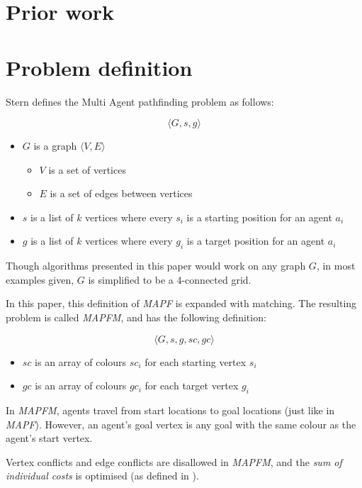 \documentclass[english]{article}
\begin{document}
\begin{multicols}{2}
\section{Prior work}


\section{Problem definition}

Stern \cite{mapf_definition_stern_2019} defines the Multi Agent pathfinding problem as follows:

$$
\langle G, s, g \rangle
$$

\begin{itemize}
    \item $G$ is a graph $\langle V, E \rangle$ 
    \begin{itemize}
        \item $V$ is a set of vertices
        \item $E$ is a set of edges between vertices
    \end{itemize}

    \item $s$ is a list of $k$ vertices where every $s_i$ is a starting position for an agent $a_i$
    \item $g$ is a list of $k$ vertices where every $g_i$ is a target position for an agent $a_i$
\end{itemize}

Though algorithms presented in this paper would work on any graph $G$, in most examples given, $G$ is simplified to be a 4-connected grid.

In this paper, this definition of \textit{MAPF} is expanded with matching. The resulting problem is called \textit{MAPFM}, and has the following definition:

$$
\langle G, s, g, sc, gc \rangle
$$

\begin{itemize}
    \item $sc$ is an array of colours $sc_i$ for each starting vertex $s_i$
    \item $gc$ is an array of colours $gc_i$ for each target vertex $g_i$
\end{itemize}

In \textit{MAPFM}, agents travel from start locations to goal locations (just like in \textit{MAPF}). However, an agent's goal vertex is any goal with the same colour as the agent's start vertex. 

Vertex conflicts and edge conflicts are disallowed in \textit{MAPFM}, and the \textit{sum of individual costs} is optimised (as defined in \cite{mapf_definition_stern_2019}). 




\end{multicols}
\end{document}
